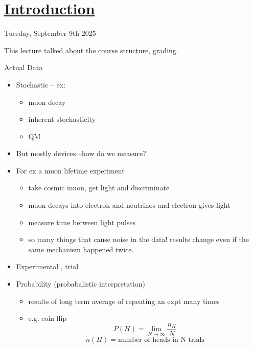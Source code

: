 \section[Introduction]{\hyperlink{toc}{Introduction}}

Tuesday, September 9th 2025

This lecture talked about the course structure, grading.


Actual Data
\begin{itemize}
      \item Stochastic -- ex:
            \begin{itemize}
                  \item muon decay
                  \item inherent stochasticity
                  \item QM
            \end{itemize}
      \item But mostly devices --how do we measure?
      \item For ex a muon lifetime experiment
            \begin{itemize}
                  \item take cosmic muon, get light and discriminate
                  \item muon decays into electron and neutrinos and electron gives light
                  \item measure time between light pulses
                  \item so many things that cause noise in the data! results change even if the same mechanism happened twice.
            \end{itemize}

      \item Experimental , trial
      \item Probability (probabalistic interpretation)
            \begin{itemize}
                  \item results of long term average of repeating an expt many times
                  \item e.g. coin flip
                        \[P(H) = \lim_{N\to\infty} \frac{n_H}{N}\]
                        \[ n(H) = \text{number of heads in N trials}\]
            \end{itemize}


\end{itemize}
